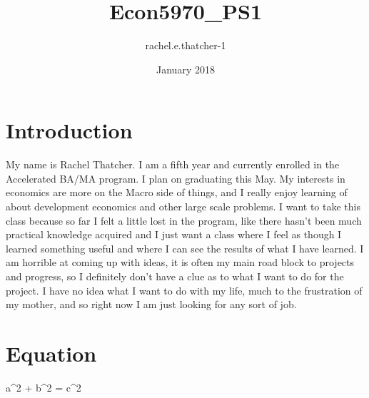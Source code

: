\documentclass{article}
\title{Econ5970_PS1}
\author{rachel.e.thatcher-1 }
\date{January 2018}
\begin{document}
\maketitle

\section{Introduction}
My name is Rachel Thatcher. I am a fifth year and currently enrolled in the Accelerated BA/MA program. I plan on graduating this May. My interests in economics are more on the Macro side of things, and I really enjoy learning of about development economics and other large scale problems. I want to take this class because so far I felt a little lost in the program, like there hasn't been much practical knowledge acquired and I just want a class where I feel as though I learned something useful and where I can see the results of what I have learned. I am horrible at coming up with ideas, it is often my main road block to projects and progress, so I definitely don't have a clue as to what I want to do for the project. I have no idea what I want to do with my life, much to the frustration of my mother, and so right now I am just looking for any sort of job.

\section{Equation}

a^2 + b^2 = c^2
\end{document}
